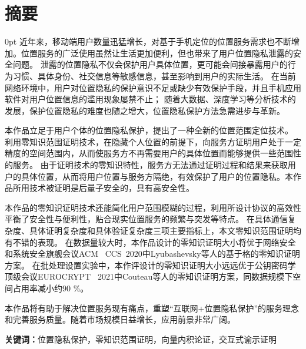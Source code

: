 \documentclass[zihao=-4]{ctexart}
\newcommand{\setParDis}{\setlength {\parskip} {0pt} }
\begin{document}
\section*{摘要}
\begin{spacing}{1.5}
  \setParDis %
近年来，移动端用户数量迅猛增长，对基于手机定位的位置服务需求也不断增加。位置服务的广泛使用虽然让生活更加便利，但也带来了用户位置隐私泄露的安全问题。
泄露的位置隐私不仅会保护用户具体位置，更可能会间接暴露用户的行为习惯、具体身份、社交信息等敏感信息，甚至影响到用户的实际生活。
在当前网络环境中，用户对位置隐私的保护意识不足或缺少有效保护手段，并且手机应用软件对用户位置信息的滥用现象屡禁不止；
随着大数据、深度学习等分析技术的发展，保护位置隐私的难度也随之增大，位置隐私保护方法急需进步与革新。\par
本作品立足于用户个体的位置隐私保护，提出了一种全新的位置范围定位技术。
利用零知识范围证明技术，在隐藏个人位置的前提下，向服务方证明用户处于一定精度的空间范围内，从而使服务方不再需要用户的具体位置而能够提供一些范围性的服务。
由于证明技术的零知识特性，服务方无法通过证明过程和结果来获取用户的具体位置，从而将用户位置与服务方隔绝，有效保护了用户的位置隐私。本作品所用技术被证明是后量子安全的，具有高安全性。
\par
本作品的零知识证明技术还能简化用户范围模糊的过程，利用所设计协议的高效性平衡了安全性与便利性，贴合现实位置服务的频繁与突发等特点。
在具体通信复杂度、具体证明复杂度和具体验证复杂度三项主要指标上，本文零知识范围证明均有不错的表现。
在数据量较大时，本作品设计的零知识证明大小将优于网络安全和系统安全旗舰会议ACM \ CCS\ 2020中Lyubashevsky等人的基于格的零知识证明方案。
在批处理设置实验中，本作评设计的零知识证明大小远远优于公钥密码学顶级会议EUROCRYPT \ 2021中Couteau等人的零知识证明方案，同数据规模下空间占用率减小约90 \%。\par
本作品将有助于解决位置服务现有痛点，重塑“互联网+位置隐私保护”的服务理念和完善服务质量。随着市场规模日益增长，应用前景非常广阔。\par
\end{spacing}
    
\textbf{关键词：}位置隐私保护，零知识范围证明，向量内积论证，交互式谕示证明
\newpage
\end{document}
